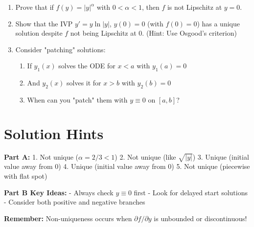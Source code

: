 \documentclass[12pt]{article}
\begin{document}
\begin{enumerate}[start=25]
    \item Prove that if $f(y) = |y|^\alpha$ with $0 < \alpha < 1$, then $f$ is not Lipschitz at $y = 0$.
    
    \item Show that the IVP $y' = y\ln|y|$, $y(0) = 0$ (with $f(0) = 0$) has a unique solution despite $f$ not being Lipschitz at 0. (Hint: Use Osgood's criterion)
    
    \item Consider "patching" solutions:
    \begin{enumerate}[label=(\alph*)]
        \item If $y_1(x)$ solves the ODE for $x < a$ with $y_1(a) = 0$
        \item And $y_2(x)$ solves it for $x > b$ with $y_2(b) = 0$
        \item When can you "patch" them with $y \equiv 0$ on $[a,b]$?
    \end{enumerate}
\end{enumerate}

\section*{Solution Hints}

\textbf{Part A:}
1. Not unique ($\alpha = 2/3 < 1$)
2. Not unique (like $\sqrt{|y|}$)
3. Unique (initial value away from 0)
4. Unique (initial value away from 0)
5. Not unique (piecewise with flat spot)

\textbf{Part B Key Ideas:}
- Always check $y \equiv 0$ first
- Look for delayed start solutions
- Consider both positive and negative branches

\textbf{Remember:} Non-uniqueness occurs when $\partial f/\partial y$ is unbounded or discontinuous!
\end{document}
